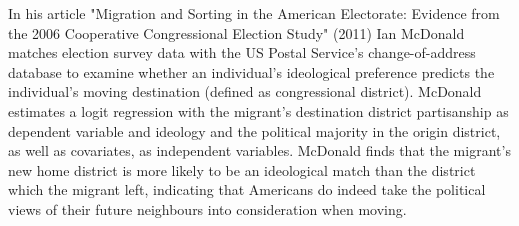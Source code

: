\documentclass[12pt, a4paper]{article}
\begin{document}
	\newline In his article "Migration and Sorting in the American Electorate: Evidence from the 2006 Cooperative Congressional Election Study" (2011) Ian McDonald matches election survey data with the US Postal Service's change-of-address database to examine whether an individual's ideological preference predicts the individual's moving destination (defined as congressional district). McDonald estimates a logit regression with the migrant's destination district partisanship as dependent variable and ideology and the political majority in the origin district, as well as covariates, as independent variables. McDonald finds that the migrant's new home district is more likely to be an ideological match than the district which the migrant left, indicating that Americans do indeed take the political views of their future neighbours into consideration when moving. 
	
\end{document}
